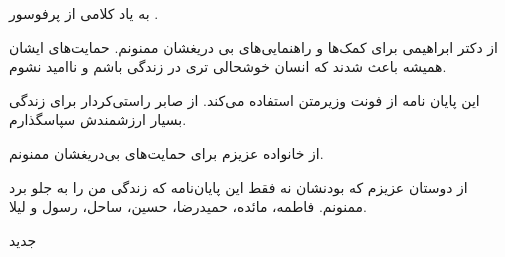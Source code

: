 


\begin{center}
\end{center}

به یاد کلامی از پرفوسور
.

از دکتر ابراهیمی برای کمک‌ها و راهنمایی‌های بی دریغشان ممنونم. حمایت‌های ایشان همیشه باعث شدند که انسان خوشحالی تری در زندگی باشم و ناامید نشوم.

این پایان نامه از فونت وزیرمتن استفاده می‌کند. از صابر راستی‌کردار برای زندگی بسیار ارزشمندش سپاسگذارم.

از خانواده عزیزم برای حمایت‌های بی‌دریغشان ممنونم.

از دوستان عزیزم که بودنشان نه فقط این پایان‌نامه که زندگی من را به جلو برد ممنونم. فاطمه، مائده، حمیدرضا، حسین، ساحل، رسول و لیلا.

‌جدید
